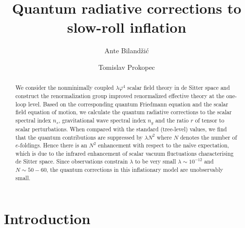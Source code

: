 


\title{\Large Quantum radiative corrections to slow-roll
inflation}

\author{Ante Biland\v{z}i\'{c}}

\author{Tomislav Prokopec}

\begin{abstract}
We consider the nonminimally coupled $\lambda\varphi^4$
scalar field theory in de Sitter space
and construct the renormalization group improved renormalized effective theory
at the one-loop level.
Based on the corresponding quantum Friedmann equation
and the scalar field equation of motion,
we calculate the quantum radiative
corrections to the scalar spectral index $n_s$, gravitational wave
spectral index $n_g$ and the ratio $r$ of tensor to scalar
perturbations. When compared with the standard (tree-level) values,
we find that the quantum contributions are suppressed by $\lambda N^2$
where $N$ denotes the number of $e$-foldings.
Hence there is an $N^2$ enhancement 
with respect to the na\"ive expectation, which is
due to the infrared enhancement of scalar vacuum fluctuations
characterising de Sitter space.
 Since observations constrain $\lambda$ to be very
small $\lambda \sim 10^{-12}$ and $N\sim 50-60$,
the quantum corrections in this inflationary model are unobservably small.

\end{abstract}


\maketitle

\section{Introduction}

